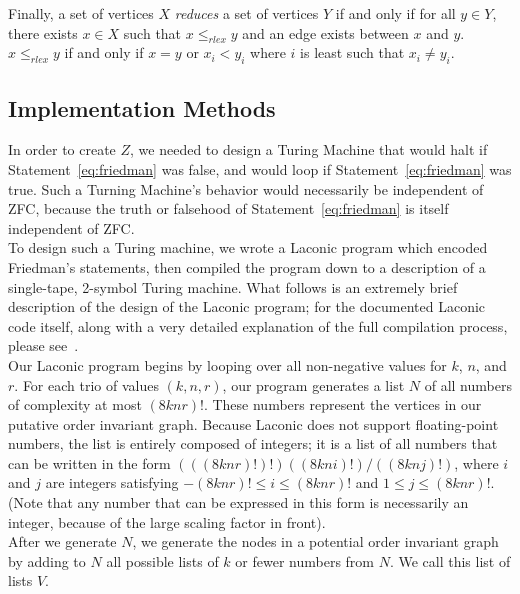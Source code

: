 \documentclass[11pt]{article}
\begin{document}
Finally, a set of vertices $X$ \emph{reduces} a set of vertices $Y$ if and only if for all $y \in Y$, there exists $x \in X$ such that $x \le_{rlex} y$ and an edge exists between $x$ and $y$. $x \le_{rlex} y$ if and only if $x = y$ or $x_i < y_i$ where $i$ is least such that $x_i \not= y_i$.~\cite{personalcomm} \\

\subsection{Implementation Methods}

In order to create $Z$, we needed to design a Turing Machine that would halt if Statement~\ref{eq:friedman} was false, and would loop if Statement~\ref{eq:friedman} was true. Such a Turning Machine's behavior would necessarily be independent of ZFC, because the truth or falsehood of  Statement~\ref{eq:friedman} is itself independent of ZFC.~\cite{friedman} \\

To design such a Turing machine, we wrote a Laconic program which encoded Friedman's statements, then compiled the program down to a description of a single-tape, 2-symbol Turing machine. What follows is an extremely brief description of the design of the Laconic program; for the documented Laconic code itself, along with a very detailed explanation of the full compilation process, please see~\cite{ref:github}. \\

Our Laconic program begins by looping over all non-negative values for $k$, $n$, and $r$. For each trio of values $(k, n, r)$, our program generates a list $N$ of all numbers of complexity at most $(8knr)!$. These numbers represent the vertices in our putative order invariant graph. Because Laconic does not support floating-point numbers, the list is entirely composed of integers; it is a list of all numbers that can be written in the form $(((8knr)!)!)((8kni)!)/((8knj)!)$, where $i$ and $j$ are integers satisfying $-(8knr)! \le i \le (8knr)!$ and $1 \le j \le (8knr)!$. (Note that any number that can be expressed in this form is necessarily an integer, because of the large scaling factor in front). \\

After we generate $N$, we generate the nodes in a potential order invariant graph by adding to $N$ all possible lists of $k$ or fewer numbers from $N$. We call this list of lists $V$. \\
\end{document}
